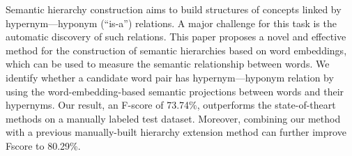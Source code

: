 Semantic hierarchy construction aims to build structures of concepts linked by hypernym---hyponym (``is-a'') relations. A major challenge for this task is the automatic discovery of such relations. This paper proposes a novel and effective method for the construction of semantic hierarchies based on word embeddings, which can be used to measure the semantic relationship between words. We identify whether a candidate word pair has hypernym---hyponym relation by using the word-embedding-based semantic projections between words and their hypernyms. Our result, an F-score of 73.74\%, outperforms the state-of-theart methods on a manually labeled test dataset. Moreover, combining our method with a previous manually-built hierarchy extension method can further improve Fscore to 80.29\%.

